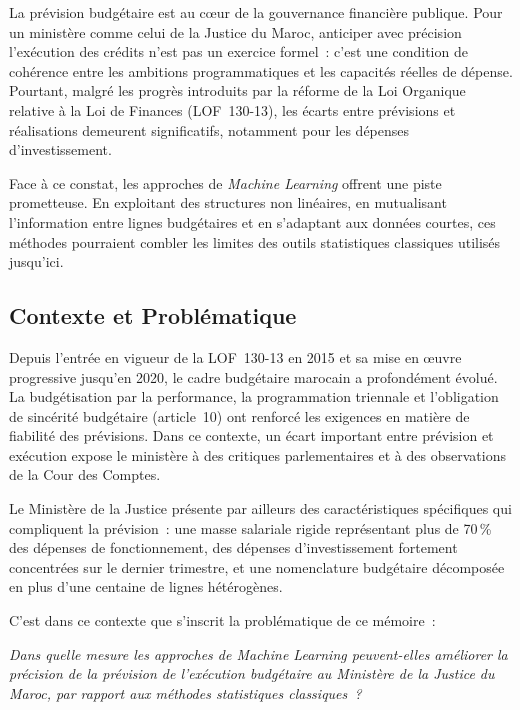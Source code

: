 \documentclass[12pt,a4paper]{article}
\begin{document}
La pr\'evision budg\'etaire est au c\oe{}ur de la gouvernance financi\`ere publique. Pour un minist\`ere comme celui de la Justice du Maroc, anticiper avec pr\'ecision l'ex\'ecution des cr\'edits n'est pas un exercice formel~: c'est une condition de coh\'erence entre les ambitions programmatiques et les capacit\'es r\'eelles de d\'epense. Pourtant, malgr\'e les progr\`es introduits par la r\'eforme de la Loi Organique relative \`a la Loi de Finances (LOF~130-13), les \'ecarts entre pr\'evisions et r\'ealisations demeurent significatifs, notamment pour les d\'epenses d'investissement.

Face \`a ce constat, les approches de \textit{Machine Learning} offrent une piste prometteuse. En exploitant des structures non lin\'eaires, en mutualisant l'information entre lignes budg\'etaires et en s'adaptant aux donn\'ees courtes, ces m\'ethodes pourraient combler les limites des outils statistiques classiques utilis\'es jusqu'ici.

\subsection*{Contexte et Probl\'ematique}

Depuis l'entr\'ee en vigueur de la LOF~130-13 en 2015 et sa mise en \oe{}uvre progressive jusqu'en 2020, le cadre budg\'etaire marocain a profond\'ement \'evolu\'e. La budg\'etisation par la performance, la programmation triennale et l'obligation de sinc\'erit\'e budg\'etaire (article~10) ont renforc\'e les exigences en mati\`ere de fiabilit\'e des pr\'evisions. Dans ce contexte, un \'ecart important entre pr\'evision et ex\'ecution expose le minist\`ere \`a des critiques parlementaires et \`a des observations de la Cour des Comptes.

Le Minist\`ere de la Justice pr\'esente par ailleurs des caract\'eristiques sp\'ecifiques qui compliquent la pr\'evision~: une masse salariale rigide repr\'esentant plus de 70\,\% des d\'epenses de fonctionnement, des d\'epenses d'investissement fortement concentr\'ees sur le dernier trimestre, et une nomenclature budg\'etaire d\'ecompos\'ee en plus d'une centaine de lignes h\'et\'erog\`enes.

C'est dans ce contexte que s'inscrit la probl\'ematique de ce m\'emoire~:

\begin{center}
\textit{Dans quelle mesure les approches de Machine Learning peuvent-elles am\'eliorer la pr\'ecision de la pr\'evision de l'ex\'ecution budg\'etaire au Minist\`ere de la Justice du Maroc, par rapport aux m\'ethodes statistiques classiques~?}
\end{center}
\end{document}

